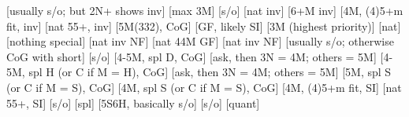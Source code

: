 \begin{bidsemi}
[usually s/o; but 2N+ shows inv]
    [max 3M]
    [s/o]
    [nat inv]
    [6+M inv]
    [4M, (4)5+m fit, inv]
    [nat 55+, inv]
    [5M(332), CoG]
[GF, likely SI]
    [3M (highest priority)]
    [nat]
    [nothing special]
[nat inv NF]
[nat 44M GF]
[nat inv NF]
[usually s/o; otherwise CoG with short]
    [s/o]
    [4-5M, spl D, CoG]
        [ask, then 3N = 4M; others = 5M]
    [4-5M, spl H (or C if M = H), CoG]
        [ask, then 3N = 4M; others = 5M]
    [5M, spl S (or C if M = S), CoG]
    [4M, spl S (or C if M = S), CoG]
[4M, (4)5+m fit, SI]
[nat 55+, SI]
[s/o]
[spl]
[5S6H, basically s/o]
[s/o]
[quant]
\end{bidsemi}